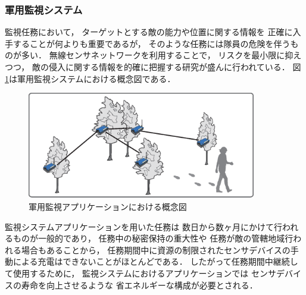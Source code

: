 \subsubsection{軍用監視システム}

\vspace{0.5em}監視任務において，
ターゲットとする敵の能力や位置に関する情報を
正確に入手することが何よりも重要であるが，
そのような任務には隊員の危険を伴うものが多い．
無線センサネットワークを利用することで，
リスクを最小限に抑えつつ，
敵の侵入に関する情報を的確に把握する研究が盛んに行われている．
図\ref{fig:surveillance_system}は軍用監視システムにおける概念図である．

\begin{figure}[htbp]
 \begin{center}
  \includegraphics[width=100mm]{./images/surveillance_system.eps}
 \end{center}
 \caption{軍用監視アプリケーションにおける概念図}
 \label{fig:surveillance_system}
\end{figure}



監視システムアプリケーションを用いた任務は
数日から数ヶ月にかけて行われるものが一般的であり，
任務中の秘密保持の重大性や
任務が敵の管轄地域行われる場合もあることから，
任務期間中に資源の制限されたセンサデバイスの手動による充電はできないことがほとんどである．
したがって任務期間中継続して使用するために，
監視システムにおけるアプリケーションでは
センサデバイスの寿命を向上させるような
省エネルギーな構成が必要とされる．

